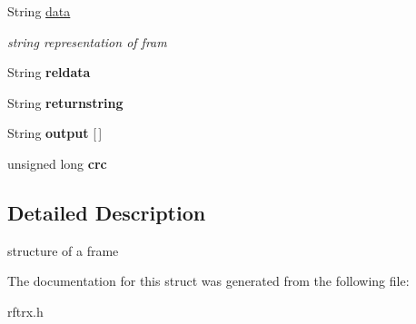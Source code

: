\begin{DoxyCompactItemize}
\mbox{\label{struct_r_fframe_a40602f9a105cd67288f12a4696c0d7c5}} 
String \mbox{\hyperlink{struct_r_fframe_a40602f9a105cd67288f12a4696c0d7c5}{data}}
\begin{DoxyCompactList}\small\item\em string representation of fram \end{DoxyCompactList}\item 
\mbox{\label{struct_r_fframe_aaf6c8ad84f495b7d1f17ad2845350ee8}} 
String {\bfseries reldata}
\item 
\mbox{\label{struct_r_fframe_a8ce9953b96e21b1ccafad800f6732bc5}} 
String {\bfseries returnstring}
\item 
\mbox{\label{struct_r_fframe_a7dbabaae363396313533d778c2f70b58}} 
String {\bfseries output} \mbox{[}$\,$\mbox{]}
\item 
\mbox{\label{struct_r_fframe_a4cf05449da9b69b320c62827a82819af}} 
unsigned long {\bfseries crc}
\end{DoxyCompactItemize}


\subsection{Detailed Description}
structure of a frame 

The documentation for this struct was generated from the following file\+:\begin{DoxyCompactItemize}
\item 
rftrx.\+h\end{DoxyCompactItemize}

